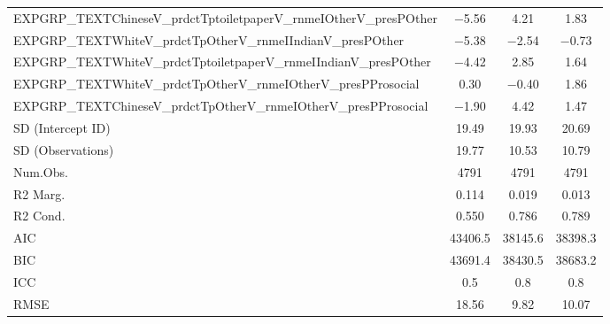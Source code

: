 \documentclass[]{report}
\begin{document}
\begin{table}
{\begin{tabular}[t]{lccc}
		EXPGRP\_TEXTChineseV\_prdctTptoiletpaperV\_rnmeIOtherV\_presPOther & \num{-5.56} & \num{4.21} & \num{1.83}\\
		EXPGRP\_TEXTWhiteV\_prdctTpOtherV\_rnmeIIndianV\_presPOther & \num{-5.38} & \num{-2.54} & \num{-0.73}\\
		EXPGRP\_TEXTWhiteV\_prdctTptoiletpaperV\_rnmeIIndianV\_presPOther & \num{-4.42} & \num{2.85} & \num{1.64}\\
		EXPGRP\_TEXTWhiteV\_prdctTpOtherV\_rnmeIOtherV\_presPProsocial & \num{0.30} & \num{-0.40} & \num{1.86}\\
		EXPGRP\_TEXTChineseV\_prdctTpOtherV\_rnmeIOtherV\_presPProsocial & \num{-1.90} & \num{4.42} & \num{1.47}\\
		SD (Intercept ID) & \num{19.49} & \num{19.93} & \num{20.69}\\
		SD (Observations) & \num{19.77} & \num{10.53} & \num{10.79}\\
		\midrule
		Num.Obs. & \num{4791} & \num{4791} & \num{4791}\\
		R2 Marg. & \num{0.114} & \num{0.019} & \num{0.013}\\
		R2 Cond. & \num{0.550} & \num{0.786} & \num{0.789}\\
		AIC & \num{43406.5} & \num{38145.6} & \num{38398.3}\\
		BIC & \num{43691.4} & \num{38430.5} & \num{38683.2}\\
		ICC & \num{0.5} & \num{0.8} & \num{0.8}\\
		RMSE & \num{18.56} & \num{9.82} & \num{10.07}\\
		\bottomrule
	\end{tabular}}
\end{table}
\end{document}
